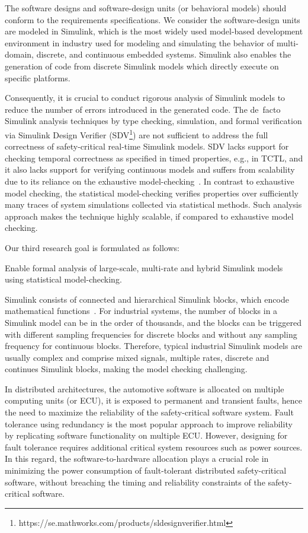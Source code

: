 The software designs and software-design units (or behavioral models) should conform to the requirements specifications. We consider the software-design units are modeled in Simulink, which is the most widely used model-based development environment in industry used for modeling and simulating the behavior of multi-domain, discrete, and continuous embedded systems. Simulink also enables the generation of code from discrete Simulink models which directly execute on specific platforms.

Consequently, it is crucial to conduct rigorous analysis of Simulink models to reduce the number of errors introduced in the generated code. The de~facto Simulink analysis techniques by type checking, simulation, and formal verification via Simulink Design Verifier (SDV\footnote{https://se.mathworks.com/products/sldesignverifier.html}) are not sufficient to address the full correctness of safety-critical real-time Simulink models. SDV lacks support for checking temporal correctness as specified in timed properties, e.g., in TCTL, and it also lacks support for verifying continuous models and suffers from scalability due to its reliance on the exhaustive model-checking~\cite{Leitner2008SimulinkStudy}. In contrast to exhaustive model checking, the statistical model-checking verifies properties over sufficiently many traces of system simulations collected via statistical methods. Such analysis approach makes the technique highly scalable, if compared to exhaustive model checking.  

Our third research goal is formulated as follows:
\begin{researchgoal}
Enable formal analysis of large-scale, multi-rate and hybrid Simulink models using statistical model-checking.
\end{researchgoal}

Simulink consists of connected and hierarchical Simulink blocks, which encode mathematical functions~\cite{JamesB.Dabney2003MasteringSimulink}. For industrial systems, the number of blocks in a Simulink model can be in the order of thousands, and the blocks can be triggered with different sampling frequencies for discrete blocks and without any sampling frequency 
for continuous blocks. Therefore, typical industrial Simulink models are usually complex and comprise mixed signals, multiple rates, discrete and continues Simulink blocks, making the model checking challenging.

In distributed architectures, the automotive software is allocated on multiple computing units (or ECU), it is exposed to permanent and transient faults, hence the need to maximize the reliability of the safety-critical software system. Fault tolerance using redundancy is the most popular approach to improve reliability by replicating software functionality on multiple ECU. However, designing for fault tolerance requires additional critical system resources such as power sources. In this regard, the software-to-hardware allocation plays a crucial role in minimizing the power consumption of fault-tolerant distributed safety-critical software, without breaching the timing and reliability constraints of the safety-critical software.

